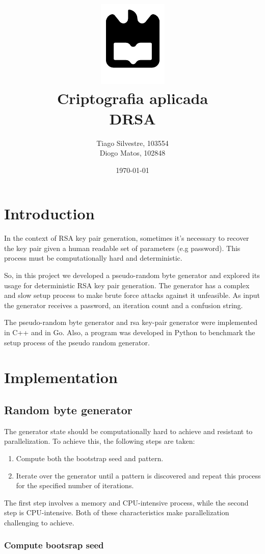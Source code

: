\documentclass{article} %
\title{%
    \includegraphics[width=0.3\linewidth]{./assets/logo.pdf}\\[20pt]
    \Huge \bfseries Criptografia aplicada \\[10pt]
    \Large DRSA
}
\author{Tiago Silvestre, 103554 \\ Diogo Matos, 102848}
\date{\today}
\begin{document}
\maketitle

\newpage

\tableofcontents

\clearpage

\section{Introduction}
In the context of RSA key pair generation, sometimes it's necessary to recover the key pair given a human readable set of parameters (e.g password). This process must be computationally hard and deterministic.

So, in this project we developed a pseudo-random byte generator and explored its usage for deterministic RSA key pair generation. 
The generator has a complex and slow setup process to make brute force attacks against it unfeasible. As input the generator receives a password, an iteration count and a confusion string.

The pseudo-random byte generator and rsa key-pair generator were implemented in C++ and in Go. Also, a program was developed in Python to benchmark the setup process of the pseudo random generator.

\section{Implementation}
\subsection{Random byte generator}
The generator state should be computationally hard to achieve and resistant to parallelization. To achieve this, the following steps are taken:

\begin{enumerate}
    \item Compute both the bootstrap seed and pattern.
    \item Iterate over the generator until a pattern is discovered and repeat this process for the specified number of iterations.
\end{enumerate}

The first step involves a memory and CPU-intensive process, while the second step is CPU-intensive. Both of these characteristics make parallelization challenging to achieve.
\subsubsection{Compute bootsrap seed}
\end{document}
